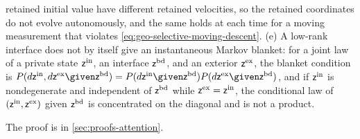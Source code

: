 retained initial value have different retained velocities, so the retained
coordinates do not evolve autonomously, and the same holds at each time for a
moving measurement that violates \eqref{eq:geo-selective-moving-descent}. (e) A
low-rank interface does not by itself give an instantaneous Markov blanket:
for a joint law of a private state \(\mathsf z^{\rm in}\), an interface
\(\mathsf z^{\rm bd}\), and an exterior \(\mathsf z^{\rm ex}\), the blanket
condition is
\(P(d\mathsf z^{\rm in},d\mathsf z^{\rm ex}\given\mathsf z^{\rm bd})
=P(d\mathsf z^{\rm in}\given\mathsf z^{\rm bd})P(d\mathsf z^{\rm ex}\given\mathsf z^{\rm bd})\),
and if \(\mathsf z^{\rm in}\) is nondegenerate and independent of
\(\mathsf z^{\rm bd}\) while \(\mathsf z^{\rm ex}=\mathsf z^{\rm in}\), the
conditional law of \((\mathsf z^{\rm in},\mathsf z^{\rm ex})\) given
\(\mathsf z^{\rm bd}\) is concentrated on the diagonal and is not a product.

The proof is in \cref{sec:proofs-attention}.

